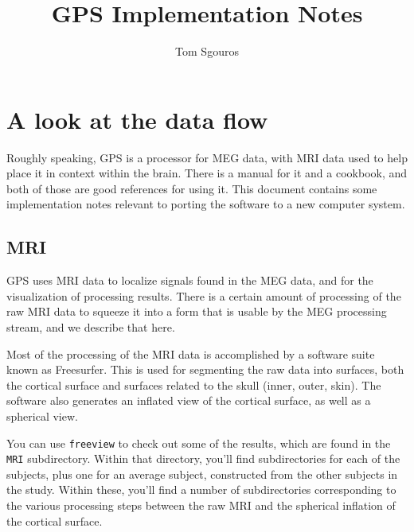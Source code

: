 \documentclass[11pt]{article}
\begin{document}
\title{GPS Implementation Notes}
\author{Tom Sgouros}

\newcommand{\dir}[1]{\texttt{#1}}
\newcommand{\exec}[1]{\texttt{#1}}

\newcommand{\fs}{Freesurfer\xspace}

\maketitle

\begin{center}
\begin{minipage}{0.8\columnwidth}\setlength{\baselineskip}{0.85\baselineskip}
\tableofcontents
\end{minipage}
\end{center}

\section{A look at the data flow}

Roughly speaking, GPS is a processor for MEG data, with MRI data used
to help place it in context within the brain.  There is a manual for
it and a cookbook, and both of those are good references for using
it.  This document contains some implementation notes relevant to
porting the software to a new computer system.


\subsection{MRI}

GPS uses MRI data to localize signals found in the MEG data, and for
the visualization of processing results.  There is a certain amount of
processing of the raw MRI data to squeeze it into a form that is
usable by the MEG processing stream, and we describe that here.

Most of the processing of the MRI data is accomplished by a software
suite known as \fs.  This is used for segmenting the raw data
into surfaces, both the cortical surface and surfaces related to the
skull (inner, outer, skin).  The software also generates an inflated
view of the cortical surface, as well as a spherical view.

You can use \exec{freeview} to check out some of the results, which
are found in the \dir{MRI} subdirectory.  Within that directory,
you'll find subdirectories for each of the subjects, plus one for an
average subject, constructed from the other subjects in the study.
Within these, you'll find a number of subdirectories corresponding to
the various processing steps between the raw MRI and the spherical
inflation of the cortical surface.
\end{document}

